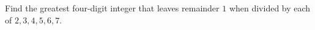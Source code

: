Find the greatest four-digit integer that leaves remainder $1$ when divided by each of $2,3,4,5,6,7$.
